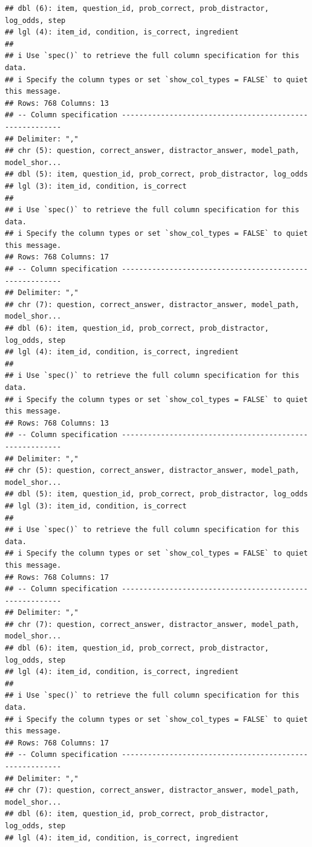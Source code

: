 \documentclass[
]{article}
\begin{document}
\begin{verbatim}
## dbl (6): item, question_id, prob_correct, prob_distractor, log_odds, step
## lgl (4): item_id, condition, is_correct, ingredient
## 
## i Use `spec()` to retrieve the full column specification for this data.
## i Specify the column types or set `show_col_types = FALSE` to quiet this message.
## Rows: 768 Columns: 13
## -- Column specification --------------------------------------------------------
## Delimiter: ","
## chr (5): question, correct_answer, distractor_answer, model_path, model_shor...
## dbl (5): item, question_id, prob_correct, prob_distractor, log_odds
## lgl (3): item_id, condition, is_correct
## 
## i Use `spec()` to retrieve the full column specification for this data.
## i Specify the column types or set `show_col_types = FALSE` to quiet this message.
## Rows: 768 Columns: 17
## -- Column specification --------------------------------------------------------
## Delimiter: ","
## chr (7): question, correct_answer, distractor_answer, model_path, model_shor...
## dbl (6): item, question_id, prob_correct, prob_distractor, log_odds, step
## lgl (4): item_id, condition, is_correct, ingredient
## 
## i Use `spec()` to retrieve the full column specification for this data.
## i Specify the column types or set `show_col_types = FALSE` to quiet this message.
## Rows: 768 Columns: 13
## -- Column specification --------------------------------------------------------
## Delimiter: ","
## chr (5): question, correct_answer, distractor_answer, model_path, model_shor...
## dbl (5): item, question_id, prob_correct, prob_distractor, log_odds
## lgl (3): item_id, condition, is_correct
## 
## i Use `spec()` to retrieve the full column specification for this data.
## i Specify the column types or set `show_col_types = FALSE` to quiet this message.
## Rows: 768 Columns: 17
## -- Column specification --------------------------------------------------------
## Delimiter: ","
## chr (7): question, correct_answer, distractor_answer, model_path, model_shor...
## dbl (6): item, question_id, prob_correct, prob_distractor, log_odds, step
## lgl (4): item_id, condition, is_correct, ingredient
## 
## i Use `spec()` to retrieve the full column specification for this data.
## i Specify the column types or set `show_col_types = FALSE` to quiet this message.
## Rows: 768 Columns: 17
## -- Column specification --------------------------------------------------------
## Delimiter: ","
## chr (7): question, correct_answer, distractor_answer, model_path, model_shor...
## dbl (6): item, question_id, prob_correct, prob_distractor, log_odds, step
## lgl (4): item_id, condition, is_correct, ingredient

\end{verbatim}
\end{document}
